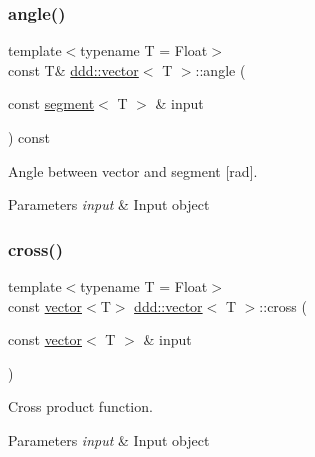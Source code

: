 \subsubsection{\texorpdfstring{angle()}{angle()}\hspace{0.1cm}{\footnotesize\ttfamily [5/5]}}
{\footnotesize\ttfamily template$<$typename T = Float$>$ \\
const T\& \hyperlink{classddd_1_1vector}{ddd\+::vector}$<$ T $>$\+::angle (\begin{DoxyParamCaption}\item[{const \hyperlink{classddd_1_1segment}{segment}$<$ T $>$ \&}]{input }\end{DoxyParamCaption}) const\hspace{0.3cm}{\ttfamily [inline]}}



Angle between vector and segment \mbox{[}rad\mbox{]}. 


\begin{DoxyParams}{Parameters}
{\em input} & Input object \\
\hline
\end{DoxyParams}
\mbox{\label{classddd_1_1vector_a27ac4cb7a469642d497cfe070935ab4b}} 
\subsubsection{\texorpdfstring{cross()}{cross()}}
{\footnotesize\ttfamily template$<$typename T = Float$>$ \\
const \hyperlink{classddd_1_1vector}{vector}$<$T$>$ \hyperlink{classddd_1_1vector}{ddd\+::vector}$<$ T $>$\+::cross (\begin{DoxyParamCaption}\item[{const \hyperlink{classddd_1_1vector}{vector}$<$ T $>$ \&}]{input }\end{DoxyParamCaption})\hspace{0.3cm}{\ttfamily [inline]}}



Cross product function. 


\begin{DoxyParams}{Parameters}
{\em input} & Input object \\
\hline
\end{DoxyParams}
\mbox{\label{classddd_1_1vector_a207ab0fdad2166078057b772edce8d0e}} 
